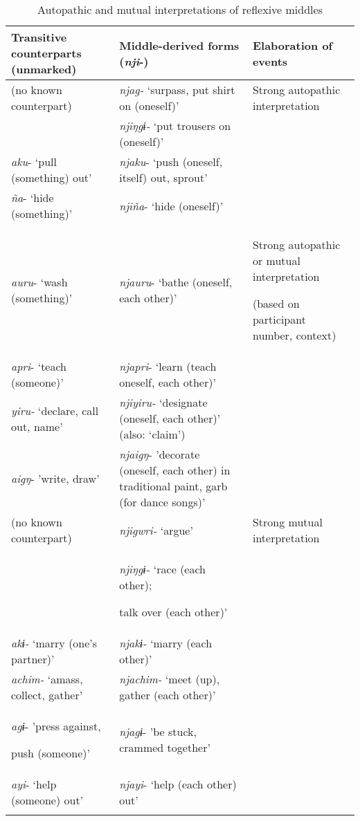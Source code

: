 \documentclass[output=paper]{langscibook}
\begin{document}
\begin{table}
\caption{Autopathic and mutual interpretations of reflexive middles}
\label{tab:brooks:3}
\begin{tabularx}{\textwidth}{QQQ}

\lsptoprule

 {Transitive} {counterparts} {(unmarked)} & { {Middle-derived} {forms}}
 {(\textit{nji}}{-)} & { {Elaboration} {of} {events}}\\
\midrule
 (no known counterpart) & \textit{njag-} ‘surpass, put shirt on (oneself)’ & { Strong autopathic interpretation}\\
& \textit{njiŋgɨ-} ‘put trousers on (oneself)’ & \\
 \textit{aku}- ‘pull (something) out’ & \textit{njaku}- ‘push (oneself, itself) out, sprout’ & \\
 \textit{ña}- ‘hide (something)’ & \textit{njiña}- ‘hide (oneself)’ & \\
 \textit{auru}- ‘wash (something)’ & \textit{njauru}- ‘bathe (oneself, each other)’ & {{ Strong autopathic or mutual interpretation}

 (based on participant number, context)}\\
 \textit{apri}- ‘teach (someone)’ & \textit{njapri}- ‘learn (teach oneself, each other)’ & \\
 \textit{yiru-} ‘declare, call out, name’ & \textit{njiyiru-} ‘designate (oneself, each other)’ (also: ‘claim’) & \\
 \textit{aigŋ}- 'write, draw' & \textit{njaigŋ}- 'decorate (oneself, each other) in traditional paint, garb (for dance songs)' & \\
 (no known counterpart) & \textit{njigwri-} ‘argue’ & { Strong mutual interpretation}\\
& { \textit{njiŋgɨ-} ‘race (each other);}

 talk over (each other)’ & \\
 \textit{akɨ-} ‘marry (one’s partner)’ & \textit{njakɨ-} ‘marry (each other)’ & \\
 \textit{achim-} ‘amass, collect, gather’ & \textit{njachim-} ‘meet (up), gather (each other)’ & \\
{ \textit{agɨ}- 'press against,}

 push (someone)' & \textit{njagɨ}- 'be stuck, crammed together' & \\
 \textit{ayi}- ‘help (someone) out’ & \textit{njayi}- ‘help (each other) out’ & \\
\lspbottomrule
\end{tabularx}
\end{table}
\end{document}
